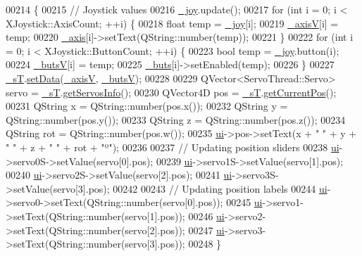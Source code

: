 \begin{DoxyCode}
00214 \{
00215     \textcolor{comment}{// Joystick values}
00216     \hyperlink{a00005_a671f35800890e518713e1946671d8730}{\_joy}.update();
00217     \textcolor{keywordflow}{for} (\textcolor{keywordtype}{int} i = 0; i < XJoystick::AxisCount; ++i) \{
00218         \textcolor{keywordtype}{float} temp = \hyperlink{a00005_a671f35800890e518713e1946671d8730}{\_joy}[i];
00219         \hyperlink{a00005_a20f66f574ed4c96d8dfc0013e1095f15}{\_axisV}[i] = temp;
00220         \hyperlink{a00005_a30c99d7a544f74b0650758e5cc7ead5a}{\_axis}[i]->setText(QString::number(temp));
00221     \}
00222     \textcolor{keywordflow}{for} (\textcolor{keywordtype}{int} i = 0; i < XJoystick::ButtonCount; ++i) \{
00223         \textcolor{keywordtype}{bool} temp = \hyperlink{a00005_a671f35800890e518713e1946671d8730}{\_joy}.button(i);
00224         \hyperlink{a00005_a519ae4630572cb63fbd04bce12fe8e77}{\_butsV}[i] = temp;
00225         \hyperlink{a00005_a8eaf474e1b8672f32873ed009e28ce8a}{\_buts}[i]->setEnabled(temp);
00226     \}
00227     \hyperlink{a00005_a97f8ecc7ecb930b796178cef7b975013}{\_sT}.\hyperlink{a00009_a8497ea56991b620981ce1fbf53d9ebdb}{setData}(\hyperlink{a00005_a20f66f574ed4c96d8dfc0013e1095f15}{\_axisV}, \hyperlink{a00005_a519ae4630572cb63fbd04bce12fe8e77}{\_butsV});
00228     
00229     QVector<ServoThread::Servo> servo = \hyperlink{a00005_a97f8ecc7ecb930b796178cef7b975013}{\_sT}.\hyperlink{a00009_a5fd8ef13314428f5ba7646730cc58f1c}{getServosInfo}();
00230     QVector4D pos = \hyperlink{a00005_a97f8ecc7ecb930b796178cef7b975013}{\_sT}.\hyperlink{a00009_a19ad0fe74d9f35220bf2864dbcecce2a}{getCurrentPos}();
00231     QString x = QString::number(pos.x());
00232     QString y = QString::number(pos.y());
00233     QString z = QString::number(pos.z());
00234     QString rot = QString::number(pos.w());
00235     \hyperlink{a00005_a35466a70ed47252a0191168126a352a5}{ui}->pos->setText(x + \textcolor{stringliteral}{" "} + y + \textcolor{stringliteral}{" "} + z + \textcolor{stringliteral}{" "} + rot + \textcolor{stringliteral}{"º"});
00236     
00237     \textcolor{comment}{// Updating position sliders}
00238     \hyperlink{a00005_a35466a70ed47252a0191168126a352a5}{ui}->servo0S->setValue(servo[0].pos);
00239     \hyperlink{a00005_a35466a70ed47252a0191168126a352a5}{ui}->servo1S->setValue(servo[1].pos);
00240     \hyperlink{a00005_a35466a70ed47252a0191168126a352a5}{ui}->servo2S->setValue(servo[2].pos);
00241     \hyperlink{a00005_a35466a70ed47252a0191168126a352a5}{ui}->servo3S->setValue(servo[3].pos);
00242     
00243     \textcolor{comment}{// Updating position labels}
00244     \hyperlink{a00005_a35466a70ed47252a0191168126a352a5}{ui}->servo0->setText(QString::number(servo[0].pos));
00245     \hyperlink{a00005_a35466a70ed47252a0191168126a352a5}{ui}->servo1->setText(QString::number(servo[1].pos));
00246     \hyperlink{a00005_a35466a70ed47252a0191168126a352a5}{ui}->servo2->setText(QString::number(servo[2].pos)); 
00247     \hyperlink{a00005_a35466a70ed47252a0191168126a352a5}{ui}->servo3->setText(QString::number(servo[3].pos));
00248 \}
\end{DoxyCode}
\hypertarget{a00005_a6fd62e117414acda4fe6a93c453dfb93}{}
